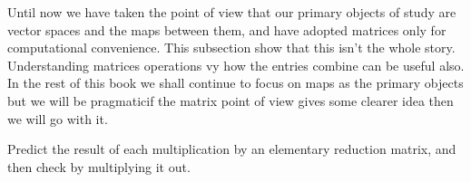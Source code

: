 Until now we have taken the point of view that our primary objects of study
are vector spaces and the maps between them, and
have adopted matrices only for computational convenience.
This subsection show that this isn't the whole story.
Understanding matrices operations vy how the entries combine can
be useful also. 
In the rest of this book we shall continue to focus on maps as the primary
objects but we will be pragmatic\Dash if the matrix point of view gives some
clearer idea then we will go with it.


\begin{exercises}
  \recommended \item
    Predict the result of each multiplication by an elementary
    reduction matrix, and then check by multiplying it out.
\end{exercises}

